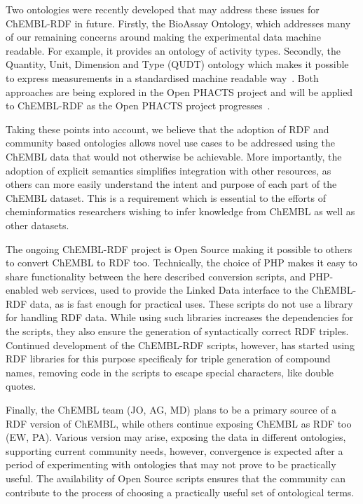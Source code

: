 \documentclass[10pt]{bmc_article}
\newenvironment{bmcformat}{\begin{raggedright}\baselineskip20pt\sloppy\setboolean{publ}{false}}{\end{raggedright}\baselineskip20pt\sloppy}
\begin{document}
\begin{bmcformat}
Two ontologies were recently developed that may address these issues for ChEMBL-RDF in future.
Firstly, the BioAssay Ontology, which addresses many of our
remaining concerns around making the experimental data machine readable. For example,
it provides an ontology of activity types. Secondly,
the Quantity, Unit, Dimension and Type (QUDT) ontology which makes it possible
to express measurements in a standardised machine readable way~\cite{QUDT}. Both approaches are 
being explored in the Open PHACTS project and will be applied to ChEMBL-RDF as the Open PHACTS
project progresses~\cite{Williams2012}.

Taking these points into account, we believe that the adoption of RDF and community based ontologies allows
novel use cases to be addressed using the ChEMBL data that would not otherwise be achievable. More importantly, the adoption of explicit
semantics simplifies integration with other resources, as others can more easily understand the intent and purpose of each part of the ChEMBL dataset.
This is a requirement which is essential to the efforts of cheminformatics researchers wishing to infer knowledge
from ChEMBL as well as other datasets.

The ongoing ChEMBL-RDF project is Open Source making it possible to others to convert ChEMBL to RDF too.
Technically, the choice of PHP makes it easy to share functionality between the
here described conversion scripts, and PHP-enabled web services, used to provide the Linked
Data interface to the ChEMBL-RDF data, as is fast enough for practical uses. These scripts do
not use a library for handling RDF data. While using such libraries increases the dependencies
for the scripts, they also ensure the generation of syntactically correct RDF triples. Continued
development of the ChEMBL-RDF scripts, however, has started using RDF libraries for this purpose
specificaly for triple generation of compound names, removing code in the scripts to escape
special characters, like double quotes.

Finally, the ChEMBL team (JO, AG, MD) plans to be a primary source of a RDF version of ChEMBL, while others continue
exposing ChEMBL as RDF too (EW, PA). Various version may arise, exposing the data in different ontologies,
supporting current community needs, however, convergence is expected after a period of experimenting with ontologies that
may not prove to be practically useful. The availability of Open Source scripts ensures that the community can contribute to the
process of choosing a practically useful set of ontological terms.


\end{bmcformat}
\end{document}
